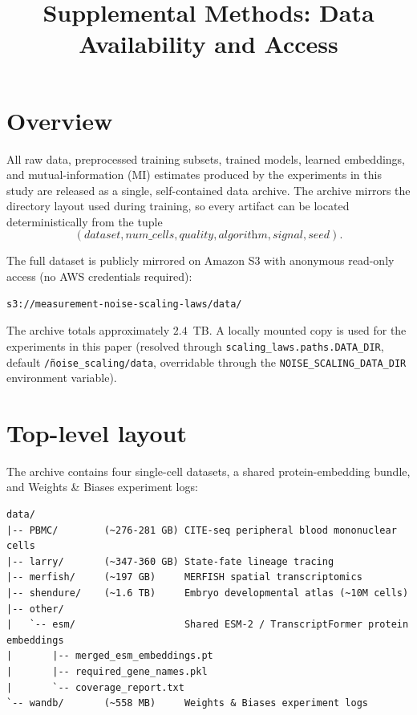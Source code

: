 \documentclass{article}
\title{Supplemental Methods: Data Availability and Access}
\author{}
\date{}
\begin{document}
\maketitle

\section{Overview}

All raw data, preprocessed training subsets, trained models, learned embeddings, and mutual-information (MI) estimates produced by the experiments in this study are released as a single, self-contained data archive. The archive mirrors the directory layout used during training, so every artifact can be located deterministically from the tuple
\[
(\textit{dataset}, \textit{num\_cells}, \textit{quality}, \textit{algorithm}, \textit{signal}, \textit{seed}).
\]

The full dataset is publicly mirrored on Amazon S3 with anonymous read-only access (no AWS credentials required):
\begin{lstlisting}
s3://measurement-noise-scaling-laws/data/
\end{lstlisting}
The archive totals approximately $2.4$~TB. A locally mounted copy is used for the experiments in this paper (resolved through \texttt{scaling\_laws.paths.DATA\_DIR}, default \texttt{\~/noise\_scaling/data}, overridable through the \texttt{NOISE\_SCALING\_DATA\_DIR} environment variable).

\section{Top-level layout}

The archive contains four single-cell datasets, a shared protein-embedding bundle, and Weights \& Biases experiment logs:

\begin{lstlisting}
data/
|-- PBMC/        (~276-281 GB) CITE-seq peripheral blood mononuclear cells
|-- larry/       (~347-360 GB) State-fate lineage tracing
|-- merfish/     (~197 GB)     MERFISH spatial transcriptomics
|-- shendure/    (~1.6 TB)     Embryo developmental atlas (~10M cells)
|-- other/
|   `-- esm/                   Shared ESM-2 / TranscriptFormer protein embeddings
|       |-- merged_esm_embeddings.pt
|       |-- required_gene_names.pkl
|       `-- coverage_report.txt
`-- wandb/       (~558 MB)     Weights & Biases experiment logs
\end{lstlisting}
\end{document}
